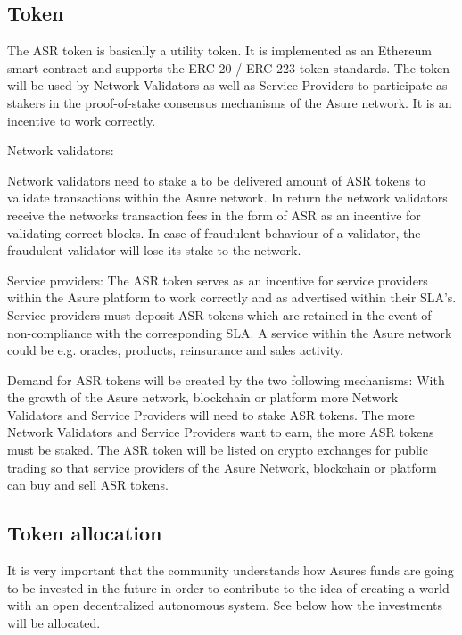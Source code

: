 \subsection{Token}

The ASR token is basically a utility token. It is implemented as an Ethereum smart contract and supports the ERC-20 / ERC-223 token standards. The token will be used by Network Validators as well as Service Providers to participate as stakers in the proof-of-stake consensus mechanisms of the Asure network. It is an incentive to work correctly.

Network validators: 

Network validators need to stake a to be delivered amount of ASR tokens to validate transactions within the Asure network. In return the network validators receive the networks transaction fees in the form of ASR as an incentive for validating correct blocks. In case of fraudulent behaviour of a validator, the fraudulent validator will lose its stake to the network.

Service providers:
The ASR token serves as an incentive for service providers within the Asure platform to work correctly and as advertised within their SLA’s. Service providers must deposit ASR tokens which are retained in the event of non-compliance with the corresponding SLA. A service within the Asure network could be e.g. oracles, products, reinsurance and sales activity.\newline

Demand for ASR tokens will be created by the two following mechanisms: With the growth of the Asure network, blockchain or platform more Network Validators and Service Providers will need to stake ASR tokens. The more Network Validators and Service Providers want to earn, the more ASR tokens must be staked.\newline
The ASR token will be listed on crypto exchanges for public trading so that service providers of the Asure Network, blockchain or platform can buy and sell ASR tokens.
\newline\newline



\subsection{Token allocation}

It is very important that the community understands how Asures funds are going to be invested in the future in order to contribute to the idea of creating a world with an open decentralized autonomous system. See below how the investments will be allocated. 

